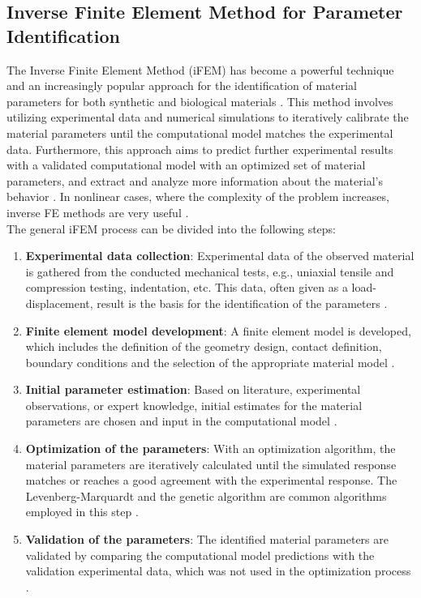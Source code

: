 \subsection{Inverse Finite Element Method for Parameter Identification}
\label{subsection:inverseFEMtheory}

The Inverse Finite Element Method (iFEM) has become a powerful technique and an increasingly 
popular approach for the identification of material parameters for both synthetic and biological materials \cite{Liu2009}. 
This method involves utilizing experimental data and numerical simulations to iteratively calibrate 
the material parameters until the computational model matches the experimental data. 
Furthermore, this approach aims to predict further experimental results with a validated computational model 
with an optimized set of material parameters, and extract and analyze more information about the material's behavior \cite{Kauer2002}.
In nonlinear cases, where the complexity of the problem increases, inverse FE methods are very useful \cite{Husain2004}.\\

The general iFEM process can be divided into the following steps:

\begin{enumerate}
        \item \textbf{Experimental data collection}: Experimental data of the observed material is gathered from the conducted mechanical tests, e.g., uniaxial tensile and compression testing, indentation, etc. This data, often given as a load-displacement, result is the basis for the identification of the parameters \cite{Seshaiyer2003}.
        \item \textbf{Finite element model development}: A finite element model is developed, which includes the definition of the geometry design, contact definition, boundary conditions and the selection of the appropriate material model \cite{Jamal2019}.
        \item \textbf{Initial parameter estimation}: Based on literature, experimental observations, or expert knowledge, initial estimates for the material parameters are chosen and input in the computational model \cite{Chawla2009}.
        \item \textbf{Optimization of the parameters}: With an optimization algorithm, the material parameters are iteratively calculated until the simulated response matches or reaches a good agreement with the experimental response. The Levenberg-Marquardt and the genetic algorithm are common algorithms employed in this step \cite{Kauer2002}.
        \item \textbf{Validation of the parameters}: The identified material parameters are validated by comparing the computational model predictions with the validation experimental data, which was not used in the optimization process \cite{Seshaiyer2003}.
\end{enumerate}

